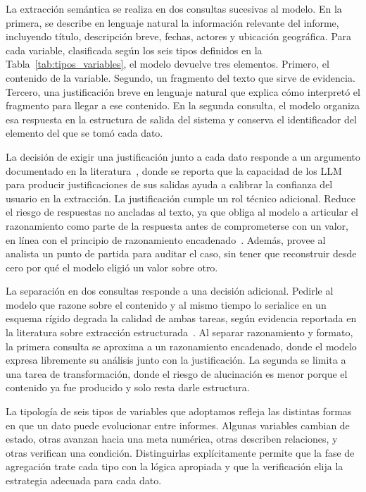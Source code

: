 La extracción semántica se realiza en dos consultas sucesivas 
al modelo. En la primera, se describe en lenguaje natural 
la información relevante del informe, incluyendo título, 
descripción breve, fechas, actores y ubicación geográfica. 
Para cada variable, clasificada según los seis tipos definidos 
en la Tabla~\ref{tab:tipos_variables}, el modelo devuelve tres 
elementos. Primero, el contenido de la variable. Segundo, un 
fragmento del texto que sirve de evidencia. Tercero, una 
justificación breve en lenguaje natural que explica cómo 
interpretó el fragmento para llegar a ese contenido. En la 
segunda consulta, el modelo organiza esa respuesta en la 
estructura de salida del sistema y conserva el identificador 
del elemento del que se tomó cada dato.

La decisión de exigir una justificación junto a cada dato 
responde a un argumento documentado en la 
literatura~\cite{yeh2025storyribbons}, donde se reporta que la 
capacidad de los \acs{LLM} para producir justificaciones de sus 
salidas ayuda a calibrar la confianza del usuario en la 
extracción. La justificación cumple un rol técnico adicional. 
Reduce el riesgo de respuestas no ancladas al texto, ya que 
obliga al modelo a articular el razonamiento como parte de la 
respuesta antes de comprometerse con un valor, en línea con el 
principio de razonamiento encadenado~\cite{wei2022}. Además, provee 
al analista un punto de partida para auditar el caso, sin 
tener que reconstruir desde cero por qué el modelo eligió un 
valor sobre otro.

La separación en dos consultas responde a una decisión 
adicional. Pedirle al modelo que razone sobre el contenido y 
al mismo tiempo lo serialice en un esquema rígido degrada la 
calidad de ambas tareas, según evidencia reportada en la 
literatura sobre extracción 
estructurada~\cite{li2024simple}. Al separar razonamiento y 
formato, la primera consulta se aproxima a un razonamiento 
encadenado, donde el modelo expresa libremente su análisis 
junto con la justificación. La segunda se limita a una tarea 
de transformación, donde el riesgo de alucinación es menor 
porque el contenido ya fue producido y solo resta darle 
estructura.

La tipología de seis tipos de variables que adoptamos refleja 
las distintas formas en que un dato puede evolucionar entre 
informes. Algunas variables cambian de estado, otras avanzan 
hacia una meta numérica, otras describen relaciones, y otras 
verifican una condición. Distinguirlas explícitamente permite 
que la fase de agregación trate cada tipo con la lógica 
apropiada y que la verificación elija la estrategia adecuada 
para cada dato.



